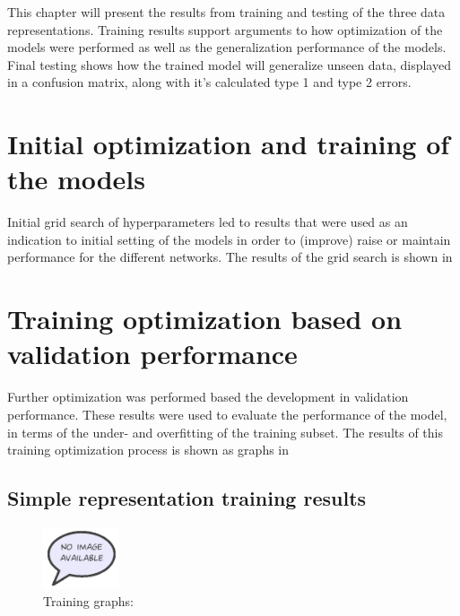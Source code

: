 \documentclass[12pt,a4paper]{article}
\author{Mads Kristensen}
\begin{document}
This chapter will present the results from training and testing of the three data representations. Training results support arguments to how optimization of the models were performed as well as the generalization performance of the models. Final testing shows how the trained model will generalize unseen data, displayed in a confusion matrix, along with it's calculated type 1 and type 2 errors. 

\section{Initial optimization and training of the models}
Initial grid search of hyperparameters led to results that were used as an indication to initial setting of the models in order to (improve) raise or maintain performance for the different networks. The results of the grid search is shown in %


\section{Training optimization based on validation performance}
Further optimization was performed based the development in validation performance. These results were used to evaluate the performance of the model, in terms of the under- and overfitting of the training subset. The results of this training optimization process is shown as graphs in %

\subsection{Simple representation training results}
\begin{figure} [H]
\centering
\includegraphics[width=0.2\textwidth]{figures/missimage}
\caption{Training graphs: }
\label{fig:simpleGraph}  
\end{figure}
\end{document}

